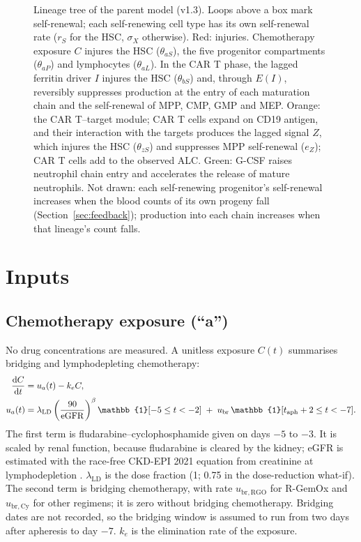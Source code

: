 \documentclass[11pt]{article}
\newcommand{\dd}{\mathrm{d}}
\newcommand{\one}{\mathbb{1}}
\begin{document}
\begin{figure}[!htbp]
\caption{Lineage tree of the parent model (v1.3). Loops above a box mark self-renewal; each self-renewing cell type has its own self-renewal rate ($r_S$ for the HSC, $\sigma_X$ otherwise). Red: injuries. Chemotherapy exposure $C$ injures the HSC ($\theta_{aS}$), the five progenitor compartments ($\theta_{aP}$) and lymphocytes ($\theta_{aL}$). In the CAR T phase, the lagged ferritin driver $I$ injures the HSC ($\theta_{bS}$) and, through $E(I)$, reversibly suppresses production at the entry of each maturation chain and the self-renewal of MPP, CMP, GMP and MEP. Orange: the CAR T--target module; CAR T cells expand on CD19 antigen, and their interaction with the targets produces the lagged signal $Z$, which injures the HSC ($\theta_{zS}$) and suppresses MPP self-renewal ($e_Z$); CAR T cells add to the observed ALC. Green: G-CSF raises neutrophil chain entry and accelerates the release of mature neutrophils. Not drawn: each self-renewing progenitor's self-renewal increases when the blood counts of its own progeny fall (Section~\ref{sec:feedback}); production into each chain increases when that lineage's count falls.}
\label{fig:tree}
\end{figure}

\section{Inputs}

\subsection{Chemotherapy exposure (``a'')}
No drug concentrations are measured. A unitless exposure $C(t)$ summarises bridging and lymphodepleting chemotherapy:
\begin{align}
\frac{\dd C}{\dd t} &= u_a(t) - k_e C, \label{eq:C}\\
u_a(t) &= \lambda_{\mathrm{LD}}\left(\frac{90}{\mathrm{eGFR}}\right)^{\beta}\one[-5\le t<-2]
 \;+\; u_{\mathrm{br}}\,\one[t_{\mathrm{aph}}+\valBrFrom \le t < \valBrTo]. \label{eq:ua}
\end{align}
The first term is fludarabine--cyclophosphamide given on days $-5$ to $-3$. It is scaled by renal function, because fludarabine is cleared by the kidney; eGFR is estimated with the race-free CKD-EPI 2021 equation from creatinine at lymphodepletion \citep{inker2021}. $\lambda_{\mathrm{LD}}$ is the dose fraction (1; 0.75 in the dose-reduction what-if). The second term is bridging chemotherapy, with rate $u_{\mathrm{br,RGO}}$ for R-GemOx and $u_{\mathrm{br,Cy}}$ for other regimens; it is zero without bridging chemotherapy. Bridging dates are not recorded, so the bridging window is assumed to run from two days after apheresis to day $-7$. $k_e$ is the elimination rate of the exposure.
\end{document}
